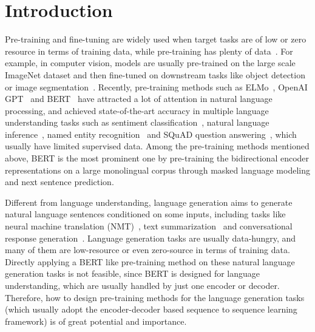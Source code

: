\documentclass{article}
\begin{document}
	\section{Introduction}
	\label{intro}
	Pre-training and fine-tuning are widely used when target tasks are of low or zero resource in terms of training data, while pre-training has plenty of data~\citep{girshick2014rich,szegedy2015going,ouyang2015learning,dai2015semi,howard2018universal,radford2018improving,devlin2018bert}. For example, in computer vision, models are usually pre-trained on the large scale ImageNet dataset and then fine-tuned on downstream tasks like object detection~\citep{szegedy2015going,ouyang2015learning} or image segmentation~\citep{girshick2014rich}. Recently, pre-training methods such as ELMo~\citep{peters2018deep}, OpenAI GPT~\citep{radford2018improving} and BERT~\citep{devlin2018bert} have attracted a lot of attention in natural language processing, and achieved state-of-the-art accuracy in multiple language understanding tasks such as sentiment classification~\citep{socher2013recursive}, natural language inference~\citep{bowmanlarge}, named entity recognition~\citep{tjong2003introduction} and SQuAD question answering~\citep{rajpurkar2016squad}, which usually have limited supervised data. Among the pre-training methods mentioned above, BERT is the most prominent one by pre-training the bidirectional encoder representations on a large monolingual corpus through masked language modeling and next sentence prediction. 
	
	Different from language understanding, language generation aims to generate natural language sentences conditioned on some inputs, including tasks like neural machine translation (NMT)~\citep{DBLP:conf/emnlp/ChoMGBBSB14,DBLP:journals/corr/BahdanauCB14,DBLP:conf/nips/VaswaniSPUJGKP17}, text summarization~\citep{Shen2016summarization,Suzuki2017summarization,Jonas2017ConvS2S} and conversational response generation~\citep{shang2015neural,DBLP:journals/corr/VinyalsL15}. Language generation tasks are usually data-hungry, and many of them are low-resource or even zero-source in terms of training data. Directly applying a BERT like pre-training method on these natural language generation tasks is not feasible, since BERT is designed for language understanding, which are usually handled by just one encoder or decoder. Therefore, how to design pre-training methods for the language generation tasks (which usually adopt the encoder-decoder based sequence to sequence learning framework) is of great potential and importance.
	
\end{document}
